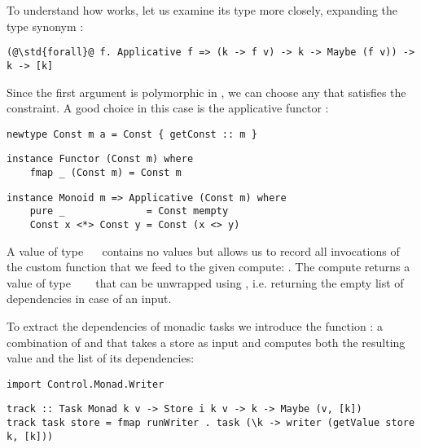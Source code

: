 To understand how  works, let us examine its type more closely,
expanding the type synonym :

\vspace{1mm}
\begin{verbatim}
(@\std{forall}@ f. Applicative f => (k -> f v) -> k -> Maybe (f v)) -> k -> [k]
\end{verbatim}
\vspace{1mm}

\noindent
Since the first argument is polymorphic in , we can choose any  that
satisfies the  constraint. A good choice in this case is the
applicative functor :

\vspace{1mm}
\begin{verbatim}
newtype Const m a = Const { getConst :: m }
\end{verbatim}
\vspace{0.5mm}
\begin{verbatim}
instance Functor (Const m) where
    fmap _ (Const m) = Const m
\end{verbatim}
\vspace{0.5mm}
\begin{verbatim}
instance Monoid m => Applicative (Const m) where
    pure _              = Const mempty
    Const x <*> Const y = Const (x <> y)
\end{verbatim}
\vspace{1mm}

\noindent
A value of type ~\hs{[}\hs{k]}~ contains no values  but
allows us to record all invocations of the custom  function that we
feed to the given compute: . The compute returns a
value of type ~~\hs{[}\hs{k]}~ that can be
unwrapped using , i.e. returning the empty list of
dependencies in case of an input.

To extract the dependencies of monadic tasks we introduce the function :
a combination of  and  that takes a store as input
and computes both the resulting value and the list of its dependencies:

\vspace{1mm}
\begin{verbatim}
import Control.Monad.Writer
\end{verbatim}
\vspace{0.5mm}
\begin{verbatim}
track :: Task Monad k v -> Store i k v -> k -> Maybe (v, [k])
track task store = fmap runWriter . task (\k -> writer (getValue store k, [k]))
\end{verbatim}
\vspace{1mm}

